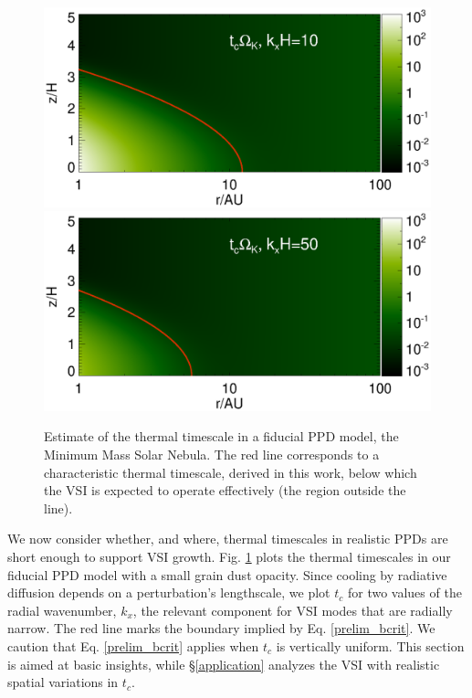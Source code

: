 \documentclass[iop]{emulateapj}
\begin{document}
\begin{figure}
  \includegraphics[width=\linewidth,clip=true,trim=0cm 1.7cm 0cm
  0.73cm]{figures/bcrit_mmsn2d_kx10}
  \includegraphics[width=\linewidth,clip=true,trim=0cm 0.46cm 0cm
  0.73cm]{figures/bcrit_mmsn2d_kx50}
  \caption{Estimate of the thermal timescale  in a fiducial 
    PPD model, the Minimum Mass Solar Nebula. The red
    line corresponds to a characteristic thermal timescale, derived in
    this work, below which the VSI is expected to operate effectively
    (the region outside the line).    
    \label{bcrit_mmsn2d} 
  }
\end{figure}

We now consider whether, and where, thermal timescales in realistic PPDs
are short enough to support VSI growth.  Fig. \ref{bcrit_mmsn2d} plots the
 thermal timescales in our fiducial PPD model with a small grain dust opacity. 
 Since cooling by radiative diffusion depends on a perturbation's lengthscale, we
 plot $t_c$ for two values of the radial wavenumber,  $k_x$,  the relevant 
 component for VSI modes that are radially narrow.   The red line
marks the boundary implied by Eq. \ref{prelim_bcrit}.  We caution that 
 Eq. \ref{prelim_bcrit} applies when $t_c$ is vertically uniform.  This section is 
 aimed at basic insights, while \S\ref{application}
 analyzes the VSI with realistic spatial variations in $t_c$.
 
\end{document}
